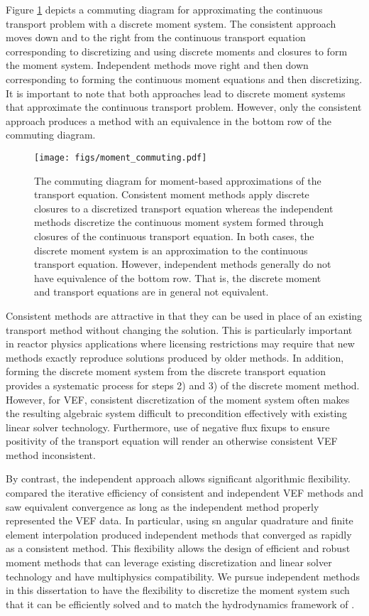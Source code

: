\documentclass[../doc.tex]{subfiles}
\begin{document}
Figure \ref{moment:commuting} depicts a commuting diagram for approximating the continuous transport problem with a discrete moment system. The consistent approach moves down and to the right from the continuous transport equation corresponding to discretizing and using discrete moments and closures to form the moment system. Independent methods move right and then down corresponding to forming the continuous moment equations and then discretizing. It is important to note that both approaches lead to discrete moment systems that approximate the continuous transport problem. However, only the consistent approach produces a method with an equivalence in the bottom row of the commuting diagram.
\begin{figure}
\centering
\texttt{[image: figs/moment\_commuting.pdf]}
\caption{The commuting diagram for moment-based approximations of the transport equation. Consistent moment methods apply discrete closures to a discretized transport equation whereas the independent methods discretize the continuous moment system formed through closures of the continuous transport equation. In both cases, the discrete moment system is an approximation to the continuous transport equation. However, independent methods generally do not have equivalence of the bottom row. That is, the discrete moment and transport equations are in general not equivalent.}
\label{moment:commuting}
\end{figure}

Consistent methods are attractive in that they can be used in place of an existing transport method without changing the solution. This is particularly important in reactor physics applications where licensing restrictions may require that new methods exactly reproduce solutions produced by older methods. In addition, forming the discrete moment system from the discrete transport equation provides a systematic process for steps 2) and 3) of the discrete moment method. However, for VEF, consistent discretization of the moment system often makes the resulting algebraic system difficult to precondition effectively with existing linear solver technology. 
Furthermore, use of negative flux fixups to ensure positivity of the transport equation will render an otherwise consistent VEF method inconsistent. 

By contrast, the independent approach allows significant algorithmic flexibility. 
\textcite{two-level-independent-warsa} compared the iterative efficiency of consistent and independent VEF methods and saw equivalent convergence as long as the independent method properly represented the VEF data. In particular, using \gls{sn} angular quadrature and finite element interpolation produced independent methods that converged as rapidly as a consistent method. This flexibility allows the design of efficient and robust moment methods that can leverage existing discretization and linear solver technology and have multiphysics compatibility. We pursue independent methods in this dissertation to have the flexibility to discretize the moment system such that it can be efficiently solved and to match the hydrodynamics framework of \cite{blast}.  
\end{document}
